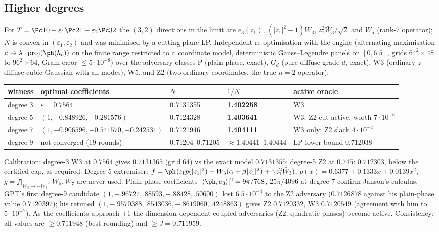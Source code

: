 \subsection{Higher degrees}
For $T=\Pc10-\varepsilon_1\Pc21-\varepsilon_2\Pc32$ the $(3,2)$ directions in the limit are $e_3(z_1)$, $(|z_1|^2-1)W_3$, $z_1^2\bar W_3/\sqrt2$ and $W_5$
(rank-7 operator); $N$ is convex in $(\varepsilon_1,\varepsilon_2)$ and was minimised by a cutting-plane LP. Independent re-optimisation with the
engine  (alternating maximisation $c\to\lambda\cdot\mathrm{proj}(\ph(h_c))$ on the finite range restricted to a coordinate model,
deterministic Gauss--Legendre panels on $[0,6.5]$, grids $64^2\times48$ to $96^2\times64$, Gram error $\le5\cdot10^{-8}$) over the adversary classes
P (plain phase, exact), $G_d$ (pure diffuse grade $d$, exact), W3 (ordinary $z$ + diffuse cubic Gaussian with all modes), W5, and Z2 (two
ordinary coordinates, the true $n=2$ operator):
\begin{center}\scriptsize\setlength\tabcolsep{3pt}
\begin{tabular}{lllll}\toprule
witness & optimal coefficients & $N$ & $1/N$ & active oracle\\\midrule
degree 3 & $\varepsilon=0.7564$ & 0.7131355 & \textbf{1.402258} & W3\\
degree 5 & $(1,-0.848926,+0.281576)$ & 0.7124328 & \textbf{1.403641} & W3; Z2 cut active, worth $7\cdot10^{-6}$\\
degree 7 & $(1,-0.906596,+0.541570,-0.242531)$ & 0.7121946 & \textbf{1.404111} & W3 only; Z2 slack $4\cdot10^{-4}$\\
degree 9 & not converged (19 rounds) & 0.71204--0.71205 & $\approx1.40441$--$1.40444$ & LP lower bound 0.712038\\\bottomrule
\end{tabular}
\end{center}
Calibration: degree-3 W3 at $0.7564$ gives $0.7131365$ (grid 64) vs the exact model $0.7131355$; degree-5 Z2 at $0.745$: $0.712303$, below the certified
cap, as required. Degree-5 extremiser: $f=\ph(z_1p(|z_1|^2)+W_3(\alpha+\beta|z_1|^2)+\gamma z_1^2\bar W_3)$, $p(x)=0.6377+0.1333x+0.0139x^2$,
$g=f|_{W_3\to-W_3}$; $W_5,W_7$ are never used. Plain phase coefficients $|\langle\ph,e_3\rangle|^2=9\pi/768$, $25\pi/4096$ at degree 7 confirm Janson's
calculus. GPT's first degree-9 candidate $(1,-.96727,.88593,-.88428,.50600)$ lost $6.5\cdot10^{-4}$ to the Z2 adversary ($0.7126878$ against his plain-phase
value $0.7120397$); his retuned $(1,-.9570388,.8543036,-.8619060,.4248863)$ gives Z2 $0.7120332$, W3 $0.7120549$ (agreement with him to $5\cdot10^{-7}$).
As the coefficients approach $\pm1$ the dimension-dependent coupled adversaries (Z2, quadratic phases) become active. Consistency: all values are
$\ge0.711948$ (best rounding) and $\ge J=0.711959$.

